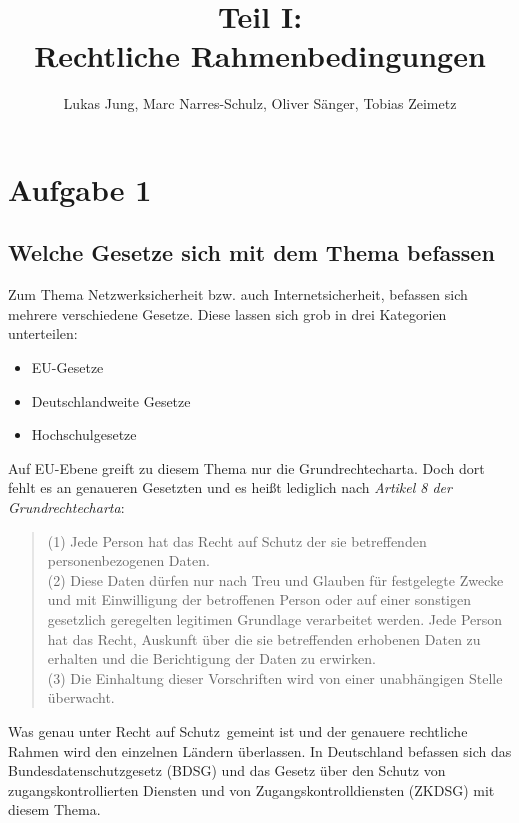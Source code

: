 \documentclass[10pt,a4paper]{article}
\author{Lukas Jung, Marc Narres-Schulz, Oliver Sänger, Tobias Zeimetz}
\title{Teil I: \\Rechtliche Rahmenbedingungen}
\begin{document}
\maketitle

\section*{Aufgabe 1}
\subsection*{Welche Gesetze sich mit dem Thema befassen}
Zum Thema Netzwerksicherheit bzw. auch Internetsicherheit, befassen sich mehrere verschiedene Gesetze. Diese lassen sich grob in drei Kategorien unterteilen:
\begin{itemize}
	\item EU-Gesetze
	\item Deutschlandweite Gesetze
	\item Hochschulgesetze
\end{itemize}
Auf EU-Ebene greift zu diesem Thema nur die Grundrechtecharta. Doch dort fehlt es an genaueren Gesetzten und es heißt lediglich nach \emph{Artikel 8 der Grundrechtecharta}:
\begin{quote}
(1) Jede Person hat das Recht auf Schutz der sie betreffenden personenbezogenen Daten.\\
(2) Diese Daten dürfen nur nach Treu und Glauben für festgelegte Zwecke und mit Einwilligung
der betroffenen Person oder auf einer sonstigen gesetzlich geregelten legitimen Grundlage verarbeitet
werden. Jede Person hat das Recht, Auskunft über die sie betreffenden erhobenen Daten zu erhalten
und die Berichtigung der Daten zu erwirken.\\
(3) Die Einhaltung dieser Vorschriften wird von einer unabhängigen Stelle überwacht.
\end{quote} 
Was genau unter \glqq Recht auf Schutz\grqq \ gemeint ist und der genauere rechtliche Rahmen wird den einzelnen Ländern überlassen. In Deutschland befassen sich das Bundesdatenschutzgesetz (BDSG) und das Gesetz über den Schutz von zugangskontrollierten Diensten und von Zugangskontrolldiensten (ZKDSG) mit diesem Thema. 
\end{document}
